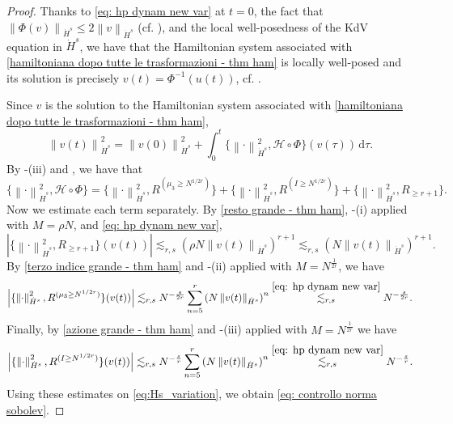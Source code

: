 \documentclass[a4paper,10pt,reqno]{article}
\theoremstyle{definition}
\theoremstyle{plain}
\theoremstyle{plain}
\theoremstyle{definition}
\theoremstyle{plain}
\theoremstyle{plain}
\theoremstyle{plain}
\theoremstyle{definition}
\theoremstyle{definition}
\newcommand{\norm}[1]{\left\lVert #1 \right\rVert}
\def \H{\mathcal{H}}
\begin{document}
\begin{proof} Thanks to \eqref{eq: hp dynam new var} at $t=0$, the fact that $\norm{\Phi (v)}_{\dot{H}^s}\leq 2 \norm{v}_{\dot{H}^s}$ (cf. ), and the local well-posedness of the KdV equation in $\dot{H}^s$, we have that the Hamiltonian system associated with \eqref{hamiltoniana dopo tutte le trasformazioni - thm ham} is locally well-posed and its solution is precisely $v(t) = \Phi^{-1}(u(t))$, cf. \cite{arnold, fasano}. 

\medskip

Since $v$ is the solution to the Hamiltonian system associated with \eqref{hamiltoniana dopo tutte le trasformazioni - thm ham},
\begin{equation}\label{eq:Hs_variation}
\norm{v(t)}_{\dot{H}^s}^2 = \norm{v(0)}_{\dot{H}^s}^2 + \int_0^t \{ \norm{\cdot}_{\dot{H}^s}^2 , \H \circ \Phi \}(v(\tau)) \, \mathrm{d} \tau.
\end{equation}
By -(iii) and , we have that
\[
\{ \norm{\cdot}_{\dot{H}^s}^2 , \H \circ \Phi \} = \{ \norm{\cdot}_{\dot{H}^s}^2 , R^{(\mu_3 \ge N^{1/2r})} \} + \{ \norm{\cdot}_{\dot{H}^s}^2 , R^{(I \ge N^{1/2r})} \} + \{ \norm{\cdot}_{\dot{H}^s}^2 , R_{\ge r+1} \}.
\]
Now we estimate each term separately.
By \eqref{resto grande - thm ham}, -(i) applied with $M = \rho N$, and  \eqref{eq: hp dynam new var},
\[
\left \lvert \{ \norm{\cdot}_{\dot{H}^s}^2 , R_{\ge r+1} \}(v(t)) \right \rvert \lesssim_{r,s} \left ( \rho N \norm{v(t)}_{\dot{H}^s} \right)^{r+1} \lesssim_{r,s} \left ( N \norm{v(t)}_{\dot{H}^s} \right)^{r+1}.
\]
By \eqref{terzo indice grande - thm ham} and -(ii) applied with $M = N^{\frac{1}{2r}}$, we have
\[
\left \lvert \{ \norm{\cdot}_{\dot{H}^s}^2 , R^{(\mu_3 \ge N^{1/2r})} \}(v(t)) \right \rvert \lesssim_{r,s} N^{-\frac{s}{2r}} \sum_{n=5}^r 
\left ( N \norm{v(t)}_{\dot{H}^s} \right )^n \stackrel{\eqref{eq: hp dynam new var}}{\lesssim_{r,s}} N^{-\frac{s}{2r}}.
\]
Finally, by \eqref{azione grande - thm ham} and -(iii) applied with $M = N^{\frac{1}{2r}}$ we have
\[
\left \lvert \{ \norm{\cdot}_{\dot{H}^s}^2 , R^{(I \ge N^{1/2r})} \}(v(t)) \right \rvert \lesssim_{r,s} N^{-\frac{s}{r}} \sum_{n=5}^{r} \left ( N \norm{v(t)}_{\dot{H}^s} \right )^n \stackrel{\eqref{eq: hp dynam new var}}{\lesssim_{r,s}} N^{-\frac{s}{r}}.
\]
Using these estimates on \eqref{eq:Hs_variation}, we obtain \eqref{eq: controllo norma sobolev}.


\end{proof}
\end{document}
